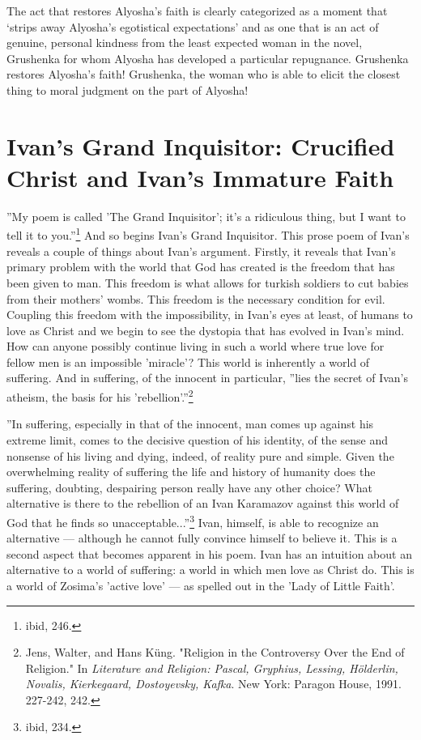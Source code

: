 	The act that restores Alyosha's faith is clearly categorized as a moment that `strips away Alyosha's egotistical expectations' and as one that is an act of genuine, personal kindness from the least expected woman in the novel, Grushenka for whom Alyosha has developed a particular repugnance. Grushenka restores Alyosha's faith! Grushenka, the woman who is able to elicit the closest thing to moral judgment on the part of Alyosha!
	
	\section{Ivan's Grand Inquisitor: Crucified Christ and Ivan's Immature Faith}

	''My poem is called 'The Grand Inquisitor'; it's a ridiculous thing, but I want to tell it to you.''\footnote{ibid, 246.} And so begins Ivan's Grand Inquisitor. This prose poem of Ivan's reveals a couple of things about Ivan's argument. Firstly, it reveals that Ivan's primary problem with the world that God has created is the freedom that has been given to man. This freedom is what allows for turkish soldiers to cut babies from their mothers' wombs. This freedom is the necessary condition for evil. Coupling this freedom with the impossibility, in Ivan's eyes at least, of humans to love as Christ and we begin to see the dystopia that has evolved in Ivan's mind. How can anyone possibly continue living in such a world where true love for fellow men is an impossible 'miracle'? This world is inherently a world of suffering. And in suffering, of the innocent in particular, ''lies the secret of Ivan's atheism, the basis for his 'rebellion'.''\footnote{Jens, Walter, and Hans Küng. "Religion in the Controversy Over the End of Religion." In \emph{Literature and Religion: Pascal, Gryphius, Lessing, Hölderlin, Novalis, Kierkegaard, Dostoyevsky, Kafka}. New York: Paragon House, 1991. 227-242, 242.}

	''In suffering, especially in that of the innocent, man comes up against his extreme limit, comes to the decisive question of his identity, of the sense and nonsense of his living and dying, indeed, of reality pure and simple. Given the overwhelming reality of suffering the life and history of humanity does the suffering, doubting, despairing person really have any other choice? What alternative is there to the rebellion of an Ivan Karamazov against this world of God that he finds so unacceptable...''\footnote{ibid, 234.} Ivan, himself, is able to recognize an alternative --- although he cannot fully convince himself to believe it. This is a second aspect that becomes apparent in his poem. Ivan has an intuition about an alternative to a world of suffering: a world in which men love as Christ do. This is a world of Zosima's 'active love' --- as spelled out in the 'Lady of Little Faith'.

